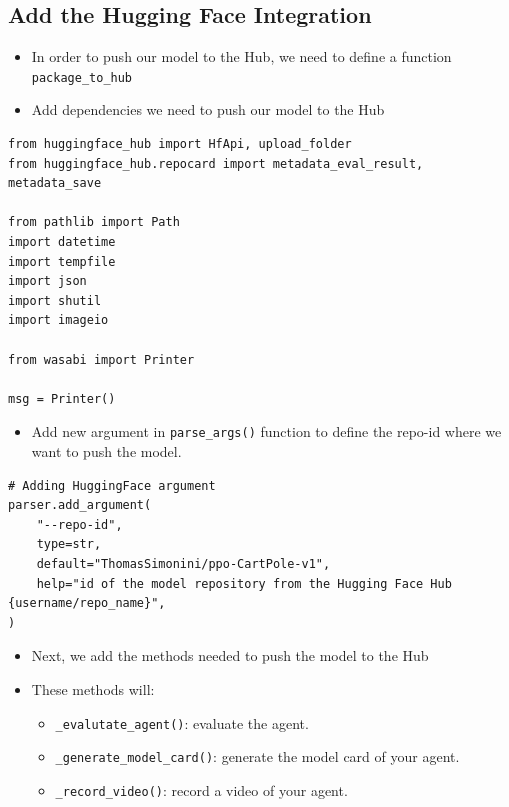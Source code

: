 \documentclass[11pt,a4paper]{article}
\begin{document}
\subsection{Add the Hugging Face Integration}\label{add-the-hugging-face-integration}

\begin{itemize}
\item
  In order to push our model to the Hub, we need to define a function \texttt{package\_to\_hub}
\item
  Add dependencies we need to push our model to the Hub
\end{itemize}

\begin{lstlisting}
from huggingface_hub import HfApi, upload_folder
from huggingface_hub.repocard import metadata_eval_result, metadata_save

from pathlib import Path
import datetime
import tempfile
import json
import shutil
import imageio

from wasabi import Printer

msg = Printer()
\end{lstlisting}

\begin{itemize}
\tightlist
\item
  Add new argument in \texttt{parse\_args()} function to define the repo-id where we want to push the model.
\end{itemize}

\begin{lstlisting}
# Adding HuggingFace argument
parser.add_argument(
    "--repo-id",
    type=str,
    default="ThomasSimonini/ppo-CartPole-v1",
    help="id of the model repository from the Hugging Face Hub {username/repo_name}",
)
\end{lstlisting}

\begin{itemize}
\item
  Next, we add the methods needed to push the model to the Hub
\item
  These methods will:

  \begin{itemize}
  \tightlist
  \item
    \texttt{\_evalutate\_agent()}: evaluate the agent.
  \item
    \texttt{\_generate\_model\_card()}: generate the model card of your agent.
  \item
    \texttt{\_record\_video()}: record a video of your agent.
  \end{itemize}
\end{itemize}
\end{document}
